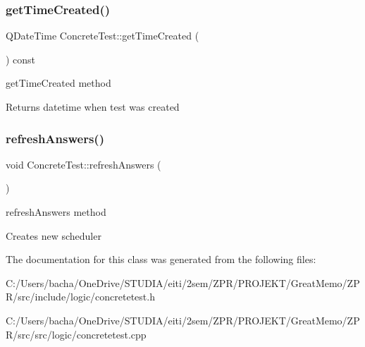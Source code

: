 \subsubsection{\texorpdfstring{get\+Time\+Created()}{getTimeCreated()}}
{\footnotesize\ttfamily Q\+Date\+Time Concrete\+Test\+::get\+Time\+Created (\begin{DoxyParamCaption}{ }\end{DoxyParamCaption}) const}



get\+Time\+Created method 

\begin{DoxyReturn}{Returns}
datetime when test was created 
\end{DoxyReturn}
\mbox{\label{class_concrete_test_a462ecfa38659f9deba5500a4ea240b15}} 
\subsubsection{\texorpdfstring{refresh\+Answers()}{refreshAnswers()}}
{\footnotesize\ttfamily void Concrete\+Test\+::refresh\+Answers (\begin{DoxyParamCaption}{ }\end{DoxyParamCaption})}



refresh\+Answers method 

Creates new scheduler 

The documentation for this class was generated from the following files\+:\begin{DoxyCompactItemize}
\item 
C\+:/\+Users/bacha/\+One\+Drive/\+S\+T\+U\+D\+I\+A/eiti/2sem/\+Z\+P\+R/\+P\+R\+O\+J\+E\+K\+T/\+Great\+Memo/\+Z\+P\+R/src/include/logic/concretetest.\+h\item 
C\+:/\+Users/bacha/\+One\+Drive/\+S\+T\+U\+D\+I\+A/eiti/2sem/\+Z\+P\+R/\+P\+R\+O\+J\+E\+K\+T/\+Great\+Memo/\+Z\+P\+R/src/src/logic/concretetest.\+cpp\end{DoxyCompactItemize}
